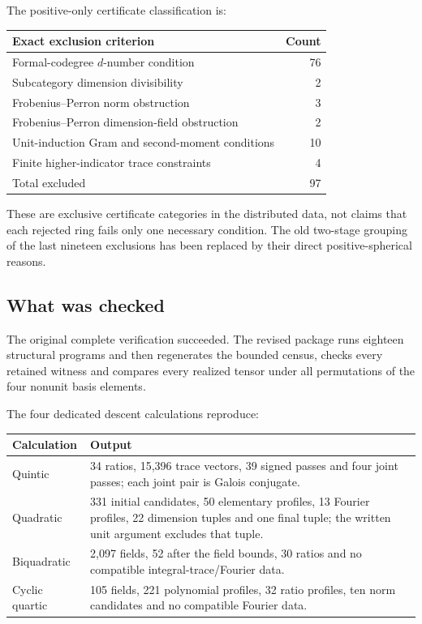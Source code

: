 \documentclass[11pt,a4paper]{article}
\newcommand{\issue}[1]{\subsection{#1}}
\begin{document}
\begin{samepage}
The positive-only certificate classification is:
\begin{center}
\begin{tabular}{@{}lr@{}}
\toprule
Exact exclusion criterion & Count\\
\midrule
Formal-codegree \(d\)-number condition & 76\\
Subcategory dimension divisibility & 2\\
Frobenius--Perron norm obstruction & 3\\
Frobenius--Perron dimension-field obstruction & 2\\
Unit-induction Gram and second-moment conditions & 10\\
Finite higher-indicator trace constraints & 4\\
\midrule
Total excluded & 97\\
\bottomrule
\end{tabular}
\end{center}
\end{samepage}

These are exclusive certificate categories in the distributed data, not
claims that each rejected ring fails only one necessary condition.
The old two-stage grouping of the last nineteen exclusions has been
replaced by their direct positive-spherical reasons.

\issue{What was checked}

The original complete verification succeeded. The revised package runs
eighteen structural programs and then regenerates the bounded census,
checks every retained witness and compares every realized tensor under
all permutations of the four nonunit basis elements.

The four dedicated descent calculations reproduce:
\begin{center}
\begin{tabularx}{\textwidth}{@{}p{}X@{}}
\toprule
Calculation & Output\\
\midrule
Quintic & 34 ratios, 15,396 trace vectors, 39 signed passes and four joint
passes; each joint pair is Galois conjugate.\\
Quadratic & 331 initial candidates, 50 elementary profiles, 13 Fourier
profiles, 22 dimension tuples and one final tuple; the written unit
argument excludes that tuple.\\
Biquadratic & 2,097 fields, 52 after the field bounds, 30 ratios and no
compatible integral-trace/Fourier data.\\
Cyclic quartic & 105 fields, 221 polynomial profiles, 32 ratio profiles,
ten norm candidates and no compatible Fourier data.\\
\bottomrule
\end{tabularx}
\end{center}
\end{document}
